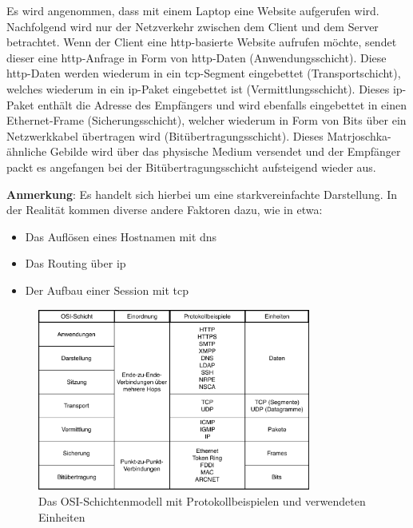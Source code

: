 \documentclass[titlepage]{report}
\begin{document}
Es wird angenommen, dass mit einem Laptop eine Website aufgerufen wird.
Nachfolgend wird nur der Netzverkehr zwischen dem Client und dem Server
betrachtet. Wenn der Client eine \gls{http}\hyp{}basierte Website
aufrufen möchte, sendet dieser eine \gls{http}\hyp{}Anfrage in Form von
\gls{http}\hyp{}Daten (Anwendungsschicht). Diese \gls{http}\hyp{}Daten
werden wiederum in ein \gls{tcp}\hyp{}Segment eingebettet (Transportschicht),
welches wiederum in ein \gls{ip}\hyp{}Paket eingebettet ist
(Vermittlungsschicht). Dieses \gls{ip}\hyp{}Paket enthält die Adresse
des Empfängers und wird ebenfalls eingebettet in einen
Ethernet\hyp{}Frame (Sicherungsschicht), welcher wiederum in Form von
Bits über ein Netzwerkkabel übertragen wird (Bitübertragungsschicht).
Dieses Matrjoschka\hyp{}ähnliche Gebilde wird über das physische
Medium versendet und der Empfänger packt es angefangen bei der
Bitübertragungsschicht aufsteigend wieder aus.

\textbf{Anmerkung}: Es handelt sich hierbei um eine starkvereinfachte
Darstellung. In der Realität kommen diverse andere Faktoren dazu, wie in
etwa:
\begin{itemize}
    \item Das Auflösen eines Hostnamen mit \gls{dns}
    \item Das Routing über \gls{ip}
    \item Der Aufbau einer Session mit \gls{tcp}
\end{itemize}
\begin{figure}[H]
    \centering
    \includegraphics[width=0.8\textwidth]{figures/osi.pdf}
    \caption{Das OSI-Schichtenmodell mit Protokollbeispielen und
    verwendeten Einheiten}\label{fig:osi}
\end{figure}
\end{document}

